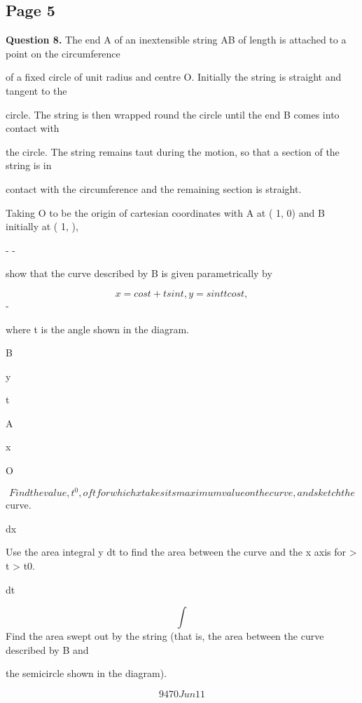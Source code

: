 \documentclass[12pt]{article}
\begin{document}
\subsection*{Page 5}
\begin{flushleft}
\bigskip\textbf{Question 8.} The end A of an inextensible string AB of length \pi is attached to a point on the circumference\par
of a fixed circle of unit radius and centre O. Initially the string is straight and tangent to the\par
circle. The string is then wrapped round the circle until the end B comes into contact with\par
the circle. The string remains taut during the motion, so that a section of the string is in\par
contact with the circumference and the remaining section is straight.\par
Taking O to be the origin of cartesian coordinates with A at ( 1, 0) and B initially at ( 1, \pi),\par
- -\par
show that the curve described by B is given parametrically by\par
\[x = cos t + t sin t , y = sin t t cos t ,\]
-\par
where t is the angle shown in the diagram.\par
B\par
y\par
t\par
A\par
x\par
O\par
\[Find the value, t^0, of t for which x takes its maximum value on the curve, and sketch the\]
curve.\par
dx\par
Use the area integral y dt to find the area between the curve and the x axis for \pi > t > t0.\par
dt\par
\[\int\]
Find the area swept out by the string (that is, the area between the curve described by B and\par
the semicircle shown in the diagram).\par
\[9470 Jun11\]
\end{flushleft}
\end{document}
